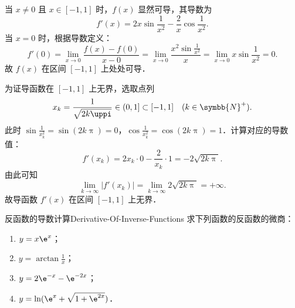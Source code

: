 \begin{myproof}
    当 $x \neq 0$ 且 $x \in [-1, 1]$ 时，$f(x)$ 显然可导，其导数为
    \begin{equation}
        f'(x) = 2x \sin \frac{1}{x^2} - \frac{2}{x}\cos \frac{1}{x^2}.
    \end{equation}
    当 $x = 0$ 时，根据导数定义：
    \begin{equation}
        f'(0) = \lim_{x\to 0} \frac{f(x) - f(0)}{x - 0} = \lim_{x\to 0} \frac{x^2\sin \frac{1}{x^2}}{x} = \lim_{x\to 0} x\sin \frac{1}{x^2} = 0.
    \end{equation}
    故 $f(x)$ 在区间 $[-1, 1]$ 上处处可导．

    为证导函数在 $[-1, 1]$ 上无界，选取点列
    \begin{equation}
        x_k = \frac{1}{\sqrt{2k\uppi}} \in (0, 1] \subset [-1, 1] \quad (k \in \symbb{N}^+).
    \end{equation}
    此时 $\sin\frac{1}{x_k^2} = \sin(2k\uppi) = 0$，$\cos\frac{1}{x_k^2} = \cos(2k\uppi) = 1$．计算对应的导数值：
    \begin{equation}
        f'(x_k) = 2x_k \cdot 0 - \frac{2}{x_k} \cdot 1 = -2\sqrt{2k\uppi}.
    \end{equation}
    由此可知
    \begin{equation}
        \lim_{k\to\infty} |f'(x_k)| = \lim_{k\to\infty} 2\sqrt{2k\uppi} = +\infty.
    \end{equation}
    故导函数 $f'(x)$ 在区间 $[-1, 1]$ 上无界．
\end{myproof}

\begin{problem}{反函数的导数计算}{Derivative-Of-Inverse-Functions}
    求下列函数的反函数的微商：
    \begin{enumerate}
        \item $y = x\e^x$；
        \item $y = \arctan \frac{1}{x}$；
        \item $y = 2\e^{-x} - \e^{-2x}$；
        \item $y = \ln(\e^x + \sqrt{1+\e^{2x}})$．
    \end{enumerate}
\end{problem}

